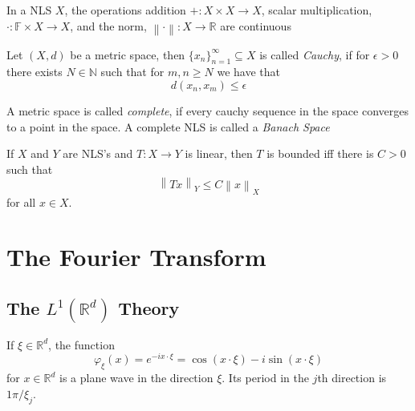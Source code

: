 \documentclass{article}
\newcommand{\norm}[1]{\left\lVert#1\right\rVert}
\newcommand{\RR}{\mathbb{R}}
\newcommand{\NN}{\mathbb{N}}
\newcommand{\FF}{\mathbb{F}}
\begin{document}
\begin{proposition}
  In a NLS $X$, the operations addition $+: X \times X \to X$, scalar multiplication, $\cdot: \FF \times X \to X$, and the norm, $\norm{\cdot}: X \to \RR$ are continuous 
\end{proposition}

\begin{definition}
  Let $(X, d)$ be a metric space, then $\{x_n\}_{n=1}^\infty \subseteq X$ is called \textit{Cauchy}, if for $\epsilon > 0$ there exists $N \in \NN$ such that for $m,n \geq N$ we have that
  \begin{equation*}
    d(x_n,x_m) \leq \epsilon
  \end{equation*}
\end{definition}
\begin{definition}
  A metric space is called \textit{complete}, if every cauchy sequence in the space converges to a point in the space. A complete NLS is called a \textit{Banach Space}
\end{definition}

\begin{proposition}
  If $X$ and $Y$ are NLS's and $T: X \to Y$ is linear, then $T$ is bounded iff there is $C > 0$ such that
  \begin{equation*}
    \norm{Tx}_Y \leq C \norm{x}_X
  \end{equation*}
  for all $x \in X$.
\end{proposition}
\section{The Fourier Transform}
\subsection{The $L^1(\mathbb{R}^d)$ Theory}

If $\xi \in \mathbb{R}^d$, the function
\begin{equation*}
  \varphi_\xi(x) = e^{-ix\cdot\xi} =  \cos(x \cdot \xi) - i \sin(x \cdot \xi)
\end{equation*}
for $x \in \mathbb{R}^d$ is a plane wave in the direction $\xi$. Its period in the $j$th direction is $1\pi/\xi_j$.
\end{document}
